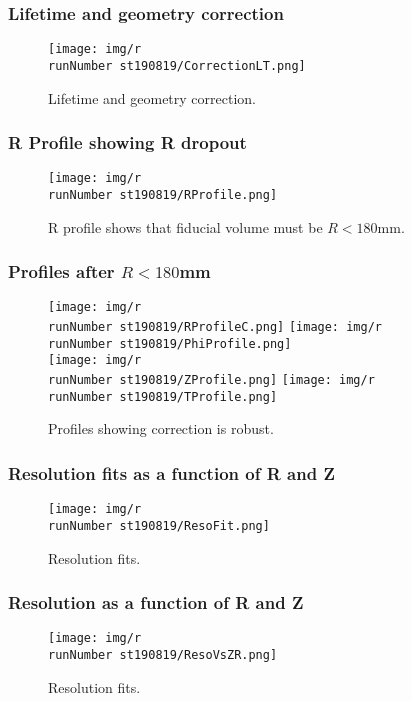 \begin{frame}
\frametitle{Lifetime and geometry correction}
\begin{figure}
  \begin{center}
      \texttt{[image: img/r\\runNumber st190819/CorrectionLT.png]}
    \caption{Lifetime and geometry correction.}
  \end{center}
\end{figure}
\end{frame}

\begin{frame}
\frametitle{R Profile showing R dropout}
\begin{figure}
  \begin{center}
      \texttt{[image: img/r\\runNumber st190819/RProfile.png]}
    \caption{R profile shows that fiducial volume must be $R < 180$mm.}
  \end{center}
\end{figure}
\end{frame}


\begin{frame}
\frametitle{Profiles after $R < 180$mm}
\begin{figure}
  \begin{center}
      \texttt{[image: img/r\\runNumber st190819/RProfileC.png]}
      \texttt{[image: img/r\\runNumber st190819/PhiProfile.png]} \\
      \texttt{[image: img/r\\runNumber st190819/ZProfile.png]}
      \texttt{[image: img/r\\runNumber st190819/TProfile.png]}
    \caption{Profiles showing correction is robust.}
  \end{center}
\end{figure}
\end{frame}

\begin{frame}
\frametitle{Resolution fits as a function of R and Z}
\begin{figure}
  \begin{center}
      \texttt{[image: img/r\\runNumber st190819/ResoFit.png]}
    \caption{Resolution fits.}
  \end{center}
\end{figure}
\end{frame}

\begin{frame}
\frametitle{Resolution as a function of R and Z}
\begin{figure}
  \begin{center}
      \texttt{[image: img/r\\runNumber st190819/ResoVsZR.png]}
    \caption{Resolution fits.}
  \end{center}
\end{figure}
\end{frame}

